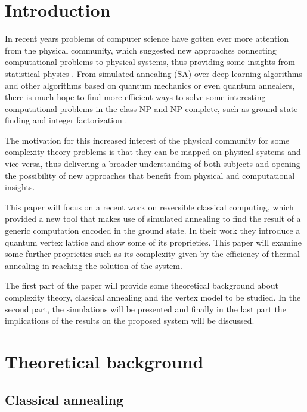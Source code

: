 
\chapter{Introduction}

In recent years problems of computer science have gotten ever more attention from the physical community, which suggested new approaches connecting computational problems to physical systems, thus providing some insights from statistical physics \cite{Altarelli}. From simulated annealing (SA) over deep learning algorithms and other algorithms based on quantum mechanics or even quantum annealers, there is much hope to find more efficient ways to solve some interesting computational problems in the class NP and NP-complete, such as ground state finding and integer factorization \cite{Henelius}.

The motivation for this increased interest of the physical community for some complexity theory problems is that they can be mapped on physical systems and vice versa, thus delivering a broader understanding of both subjects and opening the possibility of new approaches that benefit from physical and computational insights.

This paper will focus on a recent work \cite{Chamon} on reversible classical computing, which provided a new tool that makes use of simulated annealing to find the result of a generic computation encoded in the ground state.
In their work they introduce a quantum vertex lattice and show some of its proprieties.
This paper will examine some further proprieties such as its complexity given by the efficiency of thermal annealing in reaching the solution of the system.

The first part of the paper will provide some theoretical background about complexity theory, classical annealing and the vertex model to be studied. In the second part, the simulations will be presented and finally in the last part the implications of the results on the proposed system will be discussed.




\chapter{Theoretical background}

\section{Classical annealing \label{sec:SA}}

